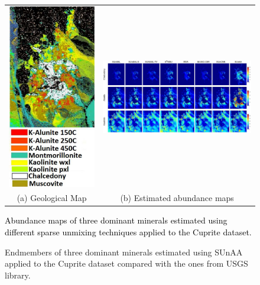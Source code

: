 \begin{figure} [h]
\centering
\begin{tabular}{cc} 
\includegraphics[width=.14\linewidth]{fichiers_latex/Chap3/figs/GRMap_Cup_HAL.pdf}&
\includegraphics[width=.6\linewidth]{fichiers_latex/Chap3/figs/Cuprite_2nd_HAL.pdf}\\
 (a) Geological Map & (b) Estimated abundance maps
 \end{tabular} %
\caption{\textcolor{black}{Abundance maps of three dominant minerals estimated using different sparse unmixing techniques applied to the Cuprite dataset.}}
\label{fig:Real dataset}
\end{figure}

\begin{figure}[h]
  \centering
  \hfil
  \hfil
  \caption{Endmembers of three dominant minerals estimated using SUnAA applied to the Cuprite dataset compared with the ones from USGS library.}
  \label{End_est}
\end{figure}

